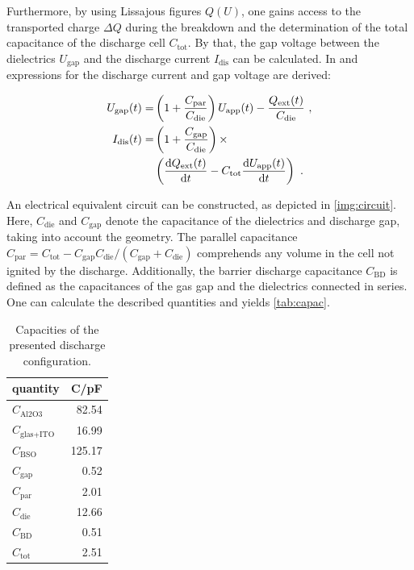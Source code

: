 \documentclass[a4paper,10pt,twoside]{article}
\newcommand{\diff}{\textnormal{d}}
\newcommand{\ix}[1]{_\text{#1}}
\begin{document}
			 Furthermore, by using Lissajous figures $Q(U)$, one gains access to the transported charge $\Delta Q$ during the breakdown and the determination of the total capacitance of the discharge cell $C\ix{tot}$. By that, the gap voltage between the dielectrics $U\ix{gap}$ and the discharge current $I\ix{dis}$ can be calculated. In \cite{Liu2003} and \cite{0022-3727-48-40-405203} expressions for the discharge current and gap voltage are derived:
			 			 
				 \begin{align}
					 U\ix{gap}(t)=&\left(1+\frac{C\ix{par}}{C\ix{die}}\right)U\ix{app}(t)-\frac{Q\ix{ext}(t)}{C\ix{die}} \,\, , \\
					 I\ix{dis}(t)=&\left(1+\frac{C\ix{gap}}{C\ix{die}}\right)\times \nonumber \\
					 &\left(\frac{\diff Q\ix{ext}(t)}{\diff t}-C\ix{tot}\frac{\diff U\ix{app}(t)}{\diff t}\right) \,\, .
				 \end{align}	
				 
			  An electrical equivalent circuit can be constructed, as depicted in \autoref{img:circuit}. Here, $C\ix{die}$ and $C\ix{gap}$ denote the capacitance of the dielectrics and discharge gap, taking into account the geometry. The parallel capacitance $C\ix{par}=C\ix{tot}-C\ix{gap}C\ix{die}/\left(C\ix{gap}+C\ix{die}\right)$ comprehends any volume in the cell not ignited by the discharge. Additionally, the barrier discharge capacitance $C\ix{BD}$ is defined as the capacitances of the gas gap and the dielectrics connected in series. One can calculate the described quantities and yields \autoref{tab:capac}.

				\begin{table}[h!]
					\centering
					\begin{tabular}{l|r}
						quantity & C/pF \\ \hline\hline
						$C\ix{Al2O3}$ &  82.54 \\ \hline
						$C\ix{glas+ITO}$ & 16.99 \\ \hline
						$C\ix{BSO}$ & 125.17 \\ \hline
						$C\ix{gap}$ & 0.52 \\ \hline
						$C\ix{par}$ & 2.01 \\ \hline
						$C\ix{die}$ & 12.66 \\ \hline
						$C\ix{BD}$ & 0.51 \\ \hline
						$C\ix{tot}$ & 2.51 \\
					\end{tabular}
					\caption{Capacities of the presented discharge configuration.}\label{tab:capac}
				\end{table}
	
\end{document}
